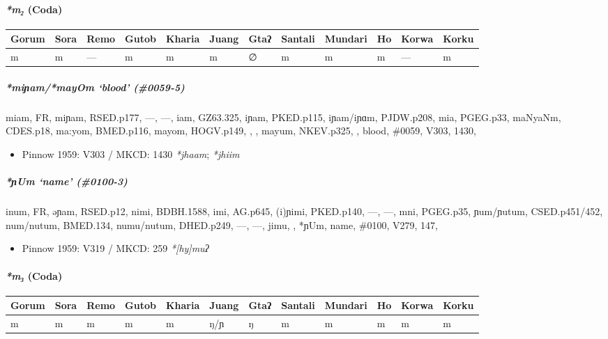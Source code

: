 \documentclass[a4paper,]{article}
\providecommand{\tightlist}{%
  \setlength{\itemsep}{0pt}\setlength{\parskip}{0pt}}
\let\oldparagraph\paragraph
\renewcommand{\paragraph}[1]{\oldparagraph{#1}\mbox{}}
\let\oldsubparagraph\subparagraph
\renewcommand{\subparagraph}[1]{\oldsubparagraph{#1}\mbox{}}
\begin{document}
\paragraph{\texorpdfstring{\emph{*m₂}
(Coda)}{*m₂ (Coda)}}\label{m-coda-1}

\begin{longtable}[]{@{}llllllllllll@{}}
\toprule
Gorum & Sora & Remo & Gutob & Kharia & Juang & Gtaʔ & Santali & Mundari
& Ho & Korwa & Korku\tabularnewline
\midrule
\endhead
m & m & --- & m & m & m & ∅ & m & m & m & --- & m\tabularnewline
\bottomrule
\end{longtable}

\subparagraph{\texorpdfstring{\emph{*miɲam}/\emph{*mayOm} `blood'
(\#0059-5)}{*miɲam/*mayOm blood (\#0059-5)}}\label{miux272ammayom-blood-0059-5}

miam, FR, miɲam, RSED.p177, ---, ---, iam, GZ63.325, iɲam, PKED.p115,
iɲam/iɲɑm, PJDW.p208, mia, PGEG.p33, maNyaNm, CDES.p18, ma:yom,
BMED.p116, mayom, HOGV.p149, , , mayum, NKEV.p325, , blood, \#0059,
V303, 1430,

\begin{itemize}
\tightlist
\item
  Pinnow 1959: V303 / MKCD: 1430 \emph{*jhaam}; \emph{*jhiim}
\end{itemize}

\subparagraph{\texorpdfstring{\emph{*ɲUm} `name'
(\#0100-3)}{*ɲUm name (\#0100-3)}}\label{ux272um-name-0100-3}

inum, FR, əɲam, RSED.p12, nimi, BDBH.1588, imi, AG.p645, (i)ɲimi,
PKED.p140, ---, ---, mni, PGEG.p35, ɲum/ɲutum, CSED.p451/452, num/nutum,
BMED.134, numu/nutum, DHED.p249, ---, ---, jimu, , *ɲUm, name, \#0100,
V279, 147,

\begin{itemize}
\tightlist
\item
  Pinnow 1959: V319 / MKCD: 259 \emph{*{[}hy{]}muʔ}
\end{itemize}

\paragraph{\texorpdfstring{\emph{*m₃}
(Coda)}{*m₃ (Coda)}}\label{m-coda-2}

\begin{longtable}[]{@{}llllllllllll@{}}
\toprule
Gorum & Sora & Remo & Gutob & Kharia & Juang & Gtaʔ & Santali & Mundari
& Ho & Korwa & Korku\tabularnewline
\midrule
\endhead
m & m & m & m & m & ŋ/ɲ & ŋ & m & m & m & m & m\tabularnewline
\bottomrule
\end{longtable}
\end{document}
